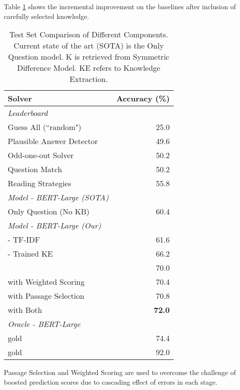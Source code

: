 \documentclass[11pt,a4paper]{article}
\begin{document}
Table \ref{exp:finalresults} shows the incremental improvement on the baselines after inclusion of carefully selected knowledge.
\begin{table}[t!]
\begin{tabular}{|lr|}
\hline
\textbf{Solver} & \textbf{Accuracy} (\%)\\
\hline
\textit{Leaderboard} & \\
Guess All (``random") & 25.0\\
Plausible Answer Detector & 49.6\\
Odd-one-out Solver & 50.2\\
Question Match & 50.2\\
Reading Strategies & 55.8\\
\hline
\textit{Model - BERT-Large (SOTA)} & \\
Only Question (No KB) & 60.4 \\
\hline
\textit{Model - BERT-Large (Our)} &  \\
 - TF-IDF& 61.6\\
 - Trained KE & 66.2\\
& 70.0\\
 with Weighted Scoring& 70.4\\
 with Passage Selection& 70.8\\
 with Both& \textbf{72.0}\\
\hline
\textit{Oracle - BERT-Large} &  \\
 gold & 74.4\\
 gold & 92.0\\
\hline
\end{tabular}
\caption{Test Set Comparison of Different Components. Current state of the art (SOTA) is the Only Question model. K is retrieved from Symmetric Difference Model. KE refers to Knowledge Extraction.}
  \label{exp:finalresults}
\end{table}




Passage Selection and Weighted Scoring are used to overcome the challenge of boosted prediction scores due to cascading effect of errors in each stage. \\

\noindent
{} \\
\end{document}
